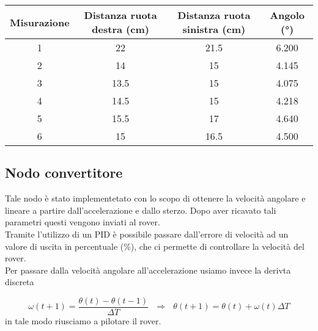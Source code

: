 \begin{table} [H]
    \centering
    \begin{tabular}{|c|c|c|c|}
    \hline
        Misurazione & Distanza ruota destra (cm) & Distanza ruota sinistra (cm) & Angolo (°) \\  \hline
        1 & 22 & 21.5& 6.200 \\  \hline
        2 & 14& 15& 4.145  \\  \hline
        3 & 13.5&15&  4.075 \\  \hline
        4 & 14.5&15&  4.218 \\  \hline
        5 & 15.5& 17& 4.640 \\  \hline
        6 & 15&16.5& 4.500  \\  \hline
    \end{tabular}
\end{table}

\subsection{Nodo convertitore}
Tale nodo è stato implementetato con lo scopo di ottenere la velocità angolare e lineare a partire dall'accelerazione e dallo sterzo. Dopo aver ricavato tali parametri questi vengono inviati al rover.\\
Tramite l'utilizzo di un PID è possibile passare dall'errore di velocità ad un valore di uscita in percentuale (\%), che ci permette di controllare la velocità del rover.\\ Per passare dalla velocità angolare all'accelerazione usiamo invece la derivta discreta

\begin{equation}
\omega(t+1)=\frac{\theta(t)-\theta(t-1)}{\Delta{T}} \ \ \
\Rightarrow \ \ \ \theta(t+1)=\theta(t)+\omega(t)\Delta{T}
\end{equation}  
in tale modo riusciamo a pilotare il rover.
